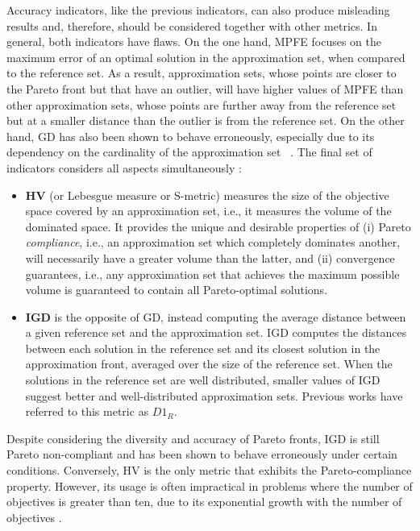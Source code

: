 	Accuracy indicators, like the previous indicators, can also produce misleading results and, therefore, should be considered together with other metrics. In general, both indicators have flaws. On the one hand, \ac{MPFE} focuses on the maximum error of an optimal solution in the approximation set, when compared to the reference set. As a result, approximation sets, whose points are closer to the Pareto front but that have an outlier, will have higher values of \ac{MPFE} than other approximation sets, whose points are further away from the reference set but at a smaller distance than the outlier is from the reference set. On the other hand, \ac{GD} has also been shown to behave erroneously, especially due to its dependency on the cardinality of the approximation set ~\cite{Ishibuchi2005GDIGD}. The final set of indicators considers all aspects simultaneously \cite{Li2017Rmetrics}:
	\begin{itemize}
		\item \textbf{\ac{HV}} (or Lebesgue measure or S-metric) measures the size of the objective space covered by an approximation set, i.e., it measures the volume of the dominated space. It provides the unique and desirable properties of (i) Pareto \textit{compliance}, i.e., an approximation set which completely dominates another, will necessarily have a greater volume than the latter, and (ii) convergence guarantees, i.e., any approximation set that achieves the maximum possible volume is guaranteed to contain all Pareto-optimal solutions.
		\item \textbf{\ac{IGD}} is the opposite of \ac{GD}, instead computing the average distance between a given reference set and the approximation set. \ac{IGD} computes the distances between each solution in the reference set and its closest solution in the approximation front, averaged over the size of the reference set. When the solutions in the reference set are well distributed, smaller values of \ac{IGD} suggest better and well-distributed approximation sets. Previous works have referred to this metric as \textbf{$D1_R$}.%
	\end{itemize}
	
	Despite considering the diversity and accuracy of Pareto fronts, \ac{IGD} is still Pareto non\nobreakdash-\hspace{0pt}compliant and has been shown to behave erroneously under certain conditions. Conversely, \ac{HV} is the only metric that exhibits the Pareto-compliance property. However, its usage is often impractical in problems where the number of objectives is greater than ten, due to its exponential growth with the number of objectives \cite{Ishibuchi2005GDIGD}.
	
